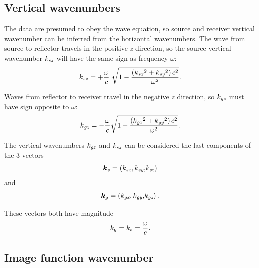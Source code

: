 \subsection{Vertical wavenumbers}

The data are presumed to obey the wave equation, so source and receiver vertical wavenumber can be inferred from the horizontal wavenumbers. The
wave from source to reflector travels in the positive \textit{z} direction, so the source vertical wavenumber \(k_{\text{\textit{sz}}}\) will have
the same sign as frequency $\omega $:
\begin{equation}\text{\textit{$k$}}_{\text{\textit{sz}}}=+\frac{\omega }{\text{\textit{$c$}}}\text{  }\sqrt{1-\frac{\left(\text{\textit{$k$}}_{\text{\textit{sx}}}{}^2+\text{\textit{$k$}}_{\text{\textit{sy}}}{}^2\right)\text{\textit{$c$}}^2}{\omega
^2}}.\end{equation}

Waves from reflector to receiver travel in the negative $z$ direction, so \(k_{\text{\textit{gz}}}\) must have sign opposite to $\omega $:
\begin{equation}\text{\textit{$k$}}_{\text{\textit{gz}}}=- \frac{\omega }{\text{\textit{$c$}}} \sqrt{1-\frac{\left(\text{\textit{$k$}}_{\text{\textit{gx}}}{}^2+\text{\textit{$k$}}_{\text{\textit{gy}}}{}^2\right)\text{\textit{$c$}}^2}{\omega
^2}}.\end{equation}

The vertical wavenumbers \(k_{\text{\textit{gz}}}\) and \(k_{\text{\textit{sz}}}\) can be considered the last components of the 3-vectors
\begin{equation}\boldsymbol{k}_s=\left(\text{\textit{$k_{\text{sx}}$}},\text{\textit{$k_{\text{sy}}$}}\text{\textit{$,$}}\text{\textit{$k_{\text{sz}}$}}\right)\end{equation}
and
\begin{equation}\boldsymbol{k}_g=\left(\text{\textit{$k_{\text{gx}}$}},\text{\textit{$k_{\text{gy}}$}}\text{\textit{$,$}}\text{\textit{$k_{\text{gz}}$}}\right).\end{equation}

These vectors both have magnitude
\begin{equation}\text{\textit{$k_g$}}=\text{\textit{$k_s$}}=\frac{\omega }{\text{\textit{$c$}}}.\end{equation}

\subsection{Image function wavenumber}

